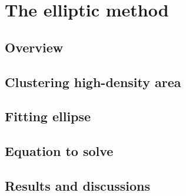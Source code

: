 \section{The elliptic method}
\label{sc:elliptic}

\subsection{Overview}


\subsection{Clustering high-density area}


\subsection{Fitting ellipse}


\subsection{Equation to solve}


\subsection{Results and discussions}
